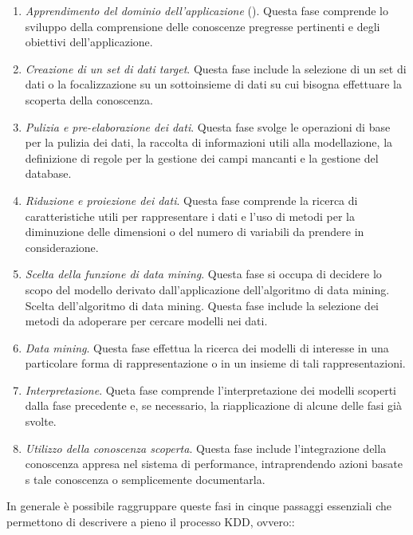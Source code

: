 \begin{enumerate}
    \item \textit{Apprendimento del dominio dell’applicazione} (). Questa fase comprende lo sviluppo della comprensione delle conoscenze pregresse pertinenti e degli obiettivi dell’applicazione.
    \item \textit{Creazione di un set di dati target}. Questa fase include la selezione di un set di dati o la focalizzazione su un sottoinsieme di dati su cui bisogna effettuare la scoperta della conoscenza.
    \item \textit{Pulizia e pre-elaborazione dei dati}. Questa fase svolge le operazioni di base per la pulizia dei dati, la raccolta di informazioni utili alla modellazione, la definizione di regole per la gestione dei campi mancanti e la gestione del database.
    \item \textit{Riduzione e proiezione dei dati}. Questa fase comprende la ricerca di caratteristiche utili per rappresentare i dati e l’uso di metodi per la diminuzione delle dimensioni o del numero di variabili da prendere in considerazione.
    \item \textit{Scelta della funzione di data mining}. Questa fase si occupa di decidere lo scopo del modello derivato dall’applicazione dell’algoritmo di data mining.
    Scelta dell’algoritmo di data mining. Questa fase include la selezione dei metodi da adoperare per cercare modelli nei dati.
    \item \textit{Data mining}. Questa fase effettua la ricerca dei modelli di interesse in una particolare forma di rappresentazione o in un insieme di tali rappresentazioni.
    \item \textit{Interpretazione}. Queta fase comprende l’interpretazione dei modelli scoperti dalla fase precedente e, se necessario, la riapplicazione di alcune delle fasi già svolte.
    \item \textit{Utilizzo della conoscenza scoperta}. Questa fase include l’integrazione della conoscenza appresa nel sistema di performance, intraprendendo azioni basate s tale conoscenza o semplicemente documentarla.
\end{enumerate}

In generale è possibile raggruppare queste fasi in cinque passaggi essenziali che permettono di descrivere a pieno il processo KDD, ovvero:\cite{knowledge_science}:

